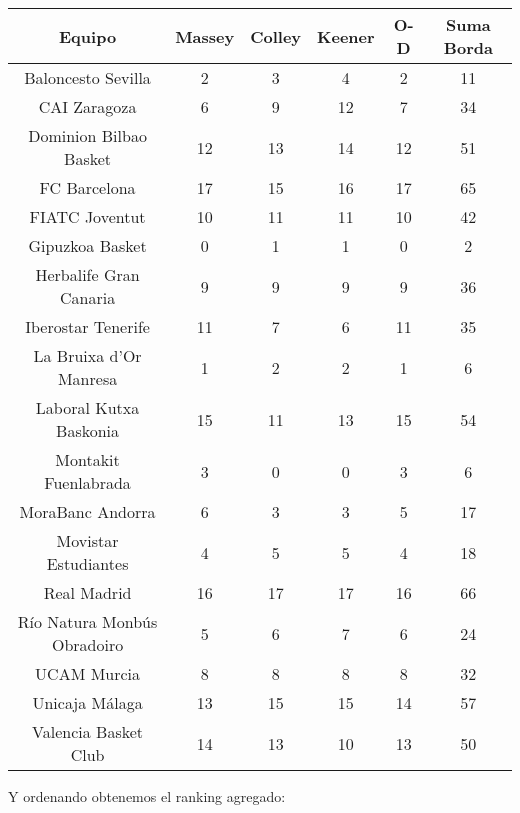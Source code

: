 \begin{center}
	\begin{tabular}{|c||c|c|c|c||c|}
	\hline \rule[-2ex]{0pt}{5.5ex} Equipo & Massey & Colley & Keener & O-D & Suma Borda \\ 
	\hline \rule[-2ex]{0pt}{5.5ex} Baloncesto Sevilla & 2 & 3 & 4 & 2 & 11 \\ 
	\hline \rule[-2ex]{0pt}{5.5ex} CAI Zaragoza & 6 & 9 & 12 & 7 & 34 \\ 
	\hline \rule[-2ex]{0pt}{5.5ex} Dominion Bilbao Basket & 12 & 13 & 14 & 12 & 51 \\ 
	\hline \rule[-2ex]{0pt}{5.5ex} FC Barcelona & 17 & 15 & 16 & 17 & 65 \\ 
	\hline \rule[-2ex]{0pt}{5.5ex} FIATC Joventut & 10 & 11 & 11 & 10 & 42 \\ 
	\hline \rule[-2ex]{0pt}{5.5ex} Gipuzkoa Basket & 0 & 1 & 1 & 0 & 2 \\ 
	\hline \rule[-2ex]{0pt}{5.5ex} Herbalife Gran Canaria & 9 & 9 & 9 & 9 & 36 \\ 
	\hline \rule[-2ex]{0pt}{5.5ex} Iberostar Tenerife & 11 & 7 & 6 & 11 & 35 \\ 
	\hline \rule[-2ex]{0pt}{5.5ex} La Bruixa d'Or Manresa & 1 & 2 & 2 & 1 & 6 \\ 
	\hline \rule[-2ex]{0pt}{5.5ex} Laboral Kutxa Baskonia & 15 & 11 & 13 & 15 & 54 \\ 
	\hline \rule[-2ex]{0pt}{5.5ex} Montakit Fuenlabrada & 3 & 0 & 0 & 3 & 6 \\ 
	\hline \rule[-2ex]{0pt}{5.5ex} MoraBanc Andorra & 6 & 3 & 3 & 5 & 17 \\ 
	\hline \rule[-2ex]{0pt}{5.5ex} Movistar Estudiantes & 4 & 5 & 5 & 4 & 18 \\ 
	\hline \rule[-2ex]{0pt}{5.5ex} Real Madrid & 16 & 17 & 17 & 16 & 66 \\ 
	\hline \rule[-2ex]{0pt}{5.5ex} Río Natura Monbús Obradoiro & 5 & 6 & 7 & 6 & 24 \\ 
	\hline \rule[-2ex]{0pt}{5.5ex} UCAM Murcia & 8 & 8 & 8 & 8 & 32 \\ 
	\hline \rule[-2ex]{0pt}{5.5ex} Unicaja Málaga & 13 & 15 & 15 & 14 & 57 \\ 
	\hline \rule[-2ex]{0pt}{5.5ex} Valencia Basket Club & 14 & 13 & 10 & 13 & 50 \\ 
	\hline 
\end{tabular}
\end{center} 
Y ordenando obtenemos el ranking agregado:\\
